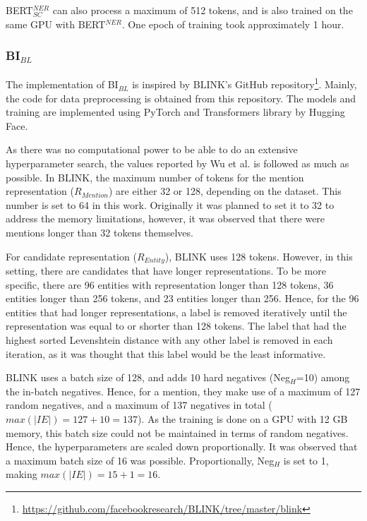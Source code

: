 \documentclass{report}
\theoremstyle{definition}
\theoremstyle{remark}
\begin{document}
BERT$^{NER}_{SC}$ can also process a maximum of 512 tokens, and is also trained on the same GPU with BERT$^{NER}$. One epoch of training took approximately 1 hour.
\subsubsection{BI$_{BL}$}
The implementation of BI$_{BL}$ is inspired by BLINK's GitHub repository\footnote{\url{https://github.com/facebookresearch/BLINK/tree/master/blink}}. Mainly, the code for data preprocessing is obtained from this repository. The models and training are implemented using PyTorch \cite{pytorch} and Transformers library by Hugging Face.

As there was no computational power to be able to do an extensive hyperparameter search, the values reported by Wu et al. \cite{scalablezeroshot} is followed as much as possible. In BLINK, the maximum number of tokens for the mention representation ($R_{Mention}$) are either 32 or 128, depending on the dataset. This number is set to 64 in this work. Originally it was planned to set it to 32 to address the memory limitations, however, it was observed that there were mentions longer than 32 tokens themselves.

For candidate representation ($R_{Entity}$), BLINK uses 128 tokens. However, in this setting, there are candidates that have longer representations. To be more specific, there are 96 entities with representation longer than 128 tokens, 36 entities longer than 256 tokens, and 23 entities longer than 256. Hence, for the 96 entities that had longer representations, a label is removed iteratively until the representation was equal to or shorter than 128 tokens. The label that had the highest sorted Levenshtein distance with any other label is removed in each iteration, as it was thought that this label would be the least informative.

BLINK uses a batch size of 128, and adds 10 hard negatives (Neg$_H$=10) among the in-batch negatives. Hence, for a mention, they make use of a maximum of 127 random negatives, and a maximum of 137 negatives in total ($max(|IE|)=127+10=137$). As the training is done on a GPU with 12 GB memory, this batch size could not be maintained in terms of random negatives. Hence, the hyperparameters are scaled down proportionally. It was observed that a maximum batch size of 16 was possible. Proportionally, Neg$_H$ is set to 1, making $max(|IE|)=15+1=16$.
\end{document}
